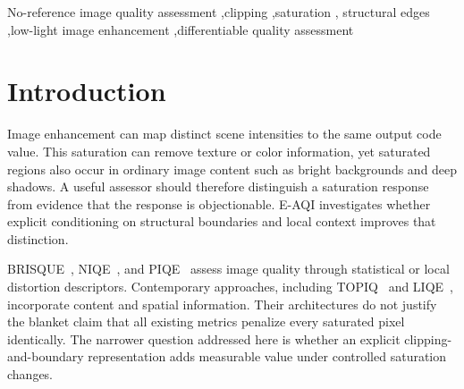 \documentclass[5p,times,twocolumn]{elsarticle}
\begin{document}
\begin{frontmatter}
\begin{abstract}
(mean $\pm$ SD over three seeds), above all non-retrained baselines
evaluated identically (best: PCoE, SRCC $= 0.191$) and below the much larger
pretrained TOPIQ-NR model (0.879). Third, the preregistered paired human
perceptual study on the released open-source platform is executed with 51
observers (126 base images, five matched conditions, 0--100 annoyance scale):
interior-texture clipping is rated more annoying than edge-aligned clipping
(mean paired difference $+5.3$ on the 0--100 scale, Wilcoxon
$p = 3.4 \times 10^{-7}$, Cohen's $d_z = 0.89$, 82\% of observers), and
annoyance separates all five conditions (Friedman $\chi^2(4) = 191.8$,
$p = 2.1 \times 10^{-40}$) with the ordering T~$>$~E~$>$~X~$>$~N~$>$~C,
replicating the deep measure's location sensitivity perceptually.
Reproducible synthetic checks verify operator consistency.
\end{abstract}

\begin{keyword}
No-reference image quality assessment \sep clipping \sep saturation \sep
structural edges \sep low-light image enhancement \sep differentiable quality assessment
\end{keyword}

\end{frontmatter}

\section{Introduction}
\label{sec:intro}

Image enhancement can map distinct scene intensities to the same output code
value. This saturation can remove texture or color information, yet saturated
regions also occur in ordinary image content such as bright backgrounds and
deep shadows. A useful assessor should therefore distinguish a saturation
response from evidence that the response is objectionable. E-AQI investigates
whether explicit conditioning on structural boundaries and local context
improves that distinction.

BRISQUE~\cite{mittal2012}, NIQE~\cite{mittal2013}, and
PIQE~\cite{venkatanath2015} assess image quality through statistical or local
distortion descriptors. Contemporary approaches, including
TOPIQ~\cite{chen2024topiq} and LIQE~\cite{zhang2023liqe}, incorporate content
and spatial information. Their architectures do not justify the blanket claim
that all existing metrics penalize every saturated pixel identically. The
narrower question addressed here is whether an explicit clipping-and-boundary
representation adds measurable value under controlled saturation changes.
\end{document}

